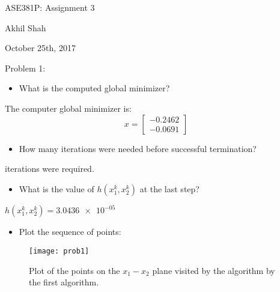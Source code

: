\documentclass{article}
\begin{document}
\begin{center}
    {\huge ASE381P: Assignment 3}
\end{center}
\begin{center}
    Akhil Shah
\end{center}
\begin{center}
    October 25th, 2017
\end{center}

\noindent
{\large Problem 1:}
\begin{itemize}
	\item What is the computed global minimizer?
\end{itemize}
\qquad \qquad The computer global minimizer is:
\begin{equation*}
	x = \begin{bmatrix} -0.2462 \\ -0.0691 \end{bmatrix}
\end{equation*}
\begin{itemize}
	\item How many iterations were needed before successful termination?
\end{itemize}
\qquad {} iterations were required. 
\begin{itemize}
	\item What is the value of $h(x_1^k, x_2^k)$ at the last step?
\end{itemize}
\qquad \qquad $h(x_1^k, x_2^k) = \num{3.0436e-05}$
\begin{itemize}
	\item Plot the sequence of points:
\end{itemize}
\begin{figure}[H]
	\centering
	\texttt{[image: prob1]}
	\caption{Plot of the points on the $x_1 - x_2$ plane visited by the algorithm by the first algorithm.}
\end{figure}
\end{document}

